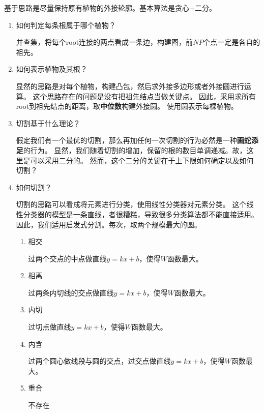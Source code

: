 \documentclass[UTF8]{ctexart}
\theoremstyle{definition}
\theoremstyle{remark}
\numberwithin{equation}{subsection}
\newcommand{\Emph}{\textbf}
\begin{document}
	基于思路是尽量保持原有植物的外接轮廓。基本算法是贪心+二分。
	\begin{enumerate}[(1)]
	
		\item 如何判定每条根属于哪个植物？
		
		并查集，将每个root连接的两点看成一条边，构建图，前$NP$个点一定是各自的祖先。
		
		\item 如何表示植物及其根？
		
		显然的思路是对每个植物，构建凸包，然后求外接多边形或者外接圆进行运算。
		这个思路存在的问题是没有把祖先结点当做关键点。
		因此，采用求所有root到祖先结点的距离，取\Emph{中位数}构建外接圆。
		使用圆表示每棵植物。
		
		\item 切割基于什么理论？
		
		假定我们有一个最优的切割，那么再加任何一次切割的行为必然是一种\Emph{画蛇添足}的行为。
		显然，我们随着切割的增加，保留的根的数目单调递减。故，这里是可以采用二分的。
		然而，这个二分的关键在于上下限如何确定以及如何切割？
		
		\item 如何切割？
		
		切割的思路可以看成将元素进行分类，使用线性分类器对元素分类。
		这个线性分类器的模型是一条直线，者很糟糕，导致很多分类算法都不能直接适用。
		因此，我们适用启发式分割。每次，取两个规模最大的圆。
		
		\begin{enumerate}[(1)]
			
			\item 相交
			
			过两个交点的中点做直线$y=kx+b$，使得$W$函数最大。
			
			\item 相离
			
			过两条内切线的交点做直线$y=kx+b$，使得$W$函数最大。
			
			\item 内切
			
			过切点做直线$y=kx+b$，使得$W$函数最大。
			
			\item 内含
			
			过两个圆心做线段与圆的交点，过交点做直线$y=kx+b$，使得$W$函数最大。
			
			\item 重合
			
			不存在
			
		\end{enumerate}
		

\end{enumerate}
\end{document}
